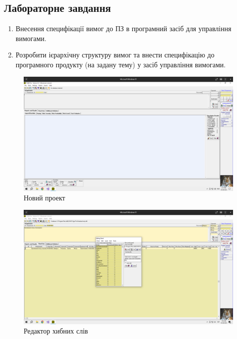\documentclass[14pt]{extreport}
\begin{document}
\begin{normalsize}
	\section*{Лабораторне завдання}
	\begin{enumerate}
		\item Внесення специфікації вимог до ПЗ в
		програмний засіб для управління вимогами.
		\item Розробити ієрархічну структуру вимог та внести специфікацію
		до програмного продукту (на задану тему) у засіб управління вимогами.
	\end{enumerate}
	
	\begin{figure}[H]
		\centering
		\includegraphics[scale=0.25]{1}
		\caption{Новий проект}
	\end{figure}

	\begin{figure}[H]
		\centering
		\includegraphics[scale=0.25]{2}
		\caption{Редактор хибних слів}
	\end{figure}
	

\end{normalsize}
\end{document}
